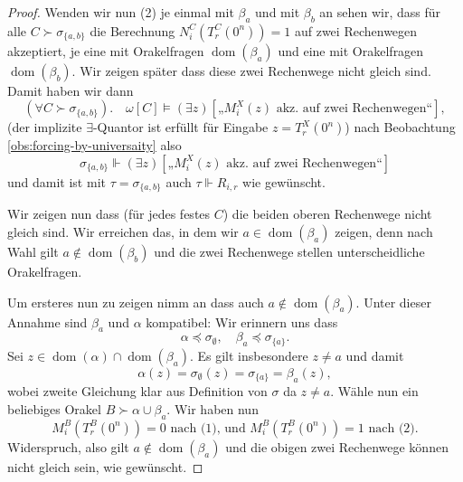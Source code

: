 \documentclass[nofonts]{uebung}
\theoremstyle{definition}
\DeclareMathOperator{\dom}{dom}
\begin{document}
\begin{proof}
    Wenden wir nun (2) je einmal mit $\beta_a$ und mit $\beta_b$ an sehen wir, dass
    für alle $C\succ \sigma_{\{a,b\}}$ die Berechnung $N^C_i(T^C_r(0^n))=1$ auf zwei Rechenwegen akzeptiert, je eine mit Orakelfragen $\dom(\beta_a)$ und eine mit Orakelfragen $\dom(\beta_b)$. Wir zeigen später dass diese zwei Rechenwege nicht gleich sind. Damit haben wir dann 
    \[ (\forall C\succ \sigma_{\{a,b\}}).\quad\omega[C]\vDash(\exists z)[\text{„$M_i^X(z)$ akz. auf zwei Rechenwegen“}], \]
    (der implizite $\exists$-Quantor ist erfüllt für Eingabe $z=T_r^X(0^n)$)
    nach Beobachtung \ref{obs:forcing-by-universaity} also
    \[ \sigma_{\{a,b\}} \Vdash(\exists z)[\text{„$M_i^X(z)$ akz. auf zwei Rechenwegen“}] \]
    und damit ist mit $\tau=\sigma_{\{a,b\}}$ auch $\tau\Vdash   R_{i,r}$ wie gewünscht.

    Wir zeigen nun dass (für jedes festes $C$) die beiden oberen Rechenwege nicht gleich sind. 
    Wir erreichen das, in dem wir $a\in\dom(\beta_a)$ zeigen, denn nach Wahl gilt $a\not\in\dom(\beta_b)$ und die zwei Rechenwege stellen unterscheidliche Orakelfragen.

    Um ersteres nun zu zeigen nimm an dass auch $a\not\in\dom(\beta_a)$.
    Unter dieser Annahme sind $\beta_a$ und $\alpha$ kompatibel:
    Wir erinnern uns dass 
    \[ \alpha\preceq\sigma_\emptyset, \quad \beta_a\preceq\sigma_{\{a\}}. \]
    Sei $z\in\dom(\alpha)\cap\dom(\beta_a)$. Es gilt insbesondere $z\neq a$ und damit
    \[ \alpha(z)=\sigma_\emptyset(z)=\sigma_{\{a\}}=\beta_a(z), \]
    wobei zweite Gleichung klar aus Definition von $\sigma$ da $z\neq a$.
    Wähle nun ein beliebiges Orakel $B\succ\alpha\cup\beta_a$.
    Wir haben nun 
    \[ M_i^B(T_r^B(0^n))=0 \text{ nach (1), und } M_i^B(T_r^B(0^n))=1 \text{ nach (2).} \]
    Widerspruch, also gilt $a\not\in\dom(\beta_a)$ und die obigen zwei Rechenwege können nicht gleich sein, wie gewünscht.
\end{proof}
\end{document}
